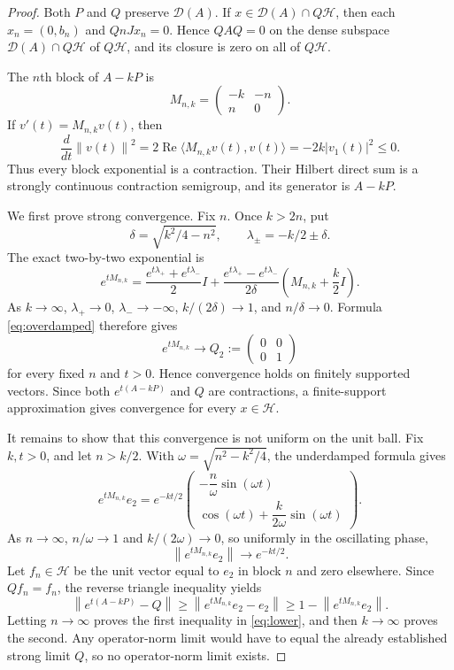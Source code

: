 \documentclass[11pt]{article}
\newcommand{\Hh}{\mathcal H}
\newcommand{\D}{\mathcal D}
\newcommand{\opnorm}[1]{\left\lVert #1\right\rVert}
\begin{document}
\begin{proof}
Both $P$ and $Q$ preserve $\D(A)$. If $x\in\D(A)\cap Q\Hh$, then each
$x_n=(0,b_n)$ and $QnJx_n=0$. Hence $QAQ=0$ on the dense subspace
$\D(A)\cap Q\Hh$ of $Q\Hh$, and its closure is zero on all of $Q\Hh$.

The $n$th block of $A-kP$ is
\[
                   M_{n,k}=\begin{pmatrix}-k&-n\\n&0\end{pmatrix}.
\]
If $v'(t)=M_{n,k}v(t)$, then
\[
       \frac{d}{dt}\opnorm{v(t)}^2
          =2\operatorname{Re}\langle M_{n,k}v(t),v(t)\rangle
          =-2k|v_1(t)|^2\le0.
\]
Thus every block exponential is a contraction. Their Hilbert direct sum is a
strongly continuous contraction semigroup, and its generator is $A-kP$.

We first prove strong convergence. Fix $n$. Once $k>2n$, put
\[
 \delta=\sqrt{k^2/4-n^2},\qquad
 \lambda_\pm=-k/2\pm\delta.
\]
The exact two-by-two exponential is
\begin{equation}\label{eq:overdamped}
 e^{tM_{n,k}}
 =\frac{e^{t\lambda_+}+e^{t\lambda_-}}2 I
 +\frac{e^{t\lambda_+}-e^{t\lambda_-}}{2\delta}
       \left(M_{n,k}+\frac{k}{2}I\right).
\end{equation}
As $k\to\infty$, $\lambda_+\to0$, $\lambda_-\to-\infty$,
$k/(2\delta)\to1$, and $n/\delta\to0$. Formula
\eqref{eq:overdamped} therefore gives
\[
             e^{tM_{n,k}}\longrightarrow
             Q_2:=\begin{pmatrix}0&0\\0&1\end{pmatrix}
\]
for every fixed $n$ and $t>0$. Hence convergence holds on finitely supported
vectors. Since both $e^{t(A-kP)}$ and $Q$ are contractions, a finite-support
approximation gives convergence for every $x\in\Hh$.

It remains to show that this convergence is not uniform on the unit ball.
Fix $k,t>0$, and let $n>k/2$. With
$\omega=\sqrt{n^2-k^2/4}$, the underdamped formula gives
\begin{equation}\label{eq:underdamped}
 e^{tM_{n,k}}e_2=e^{-kt/2}
 \begin{pmatrix}
 -\dfrac{n}{\omega}\sin(\omega t)\\[4pt]
 \cos(\omega t)+\dfrac{k}{2\omega}\sin(\omega t)
 \end{pmatrix}.
\end{equation}
As $n\to\infty$, $n/\omega\to1$ and $k/(2\omega)\to0$, so uniformly in the
oscillating phase,
\[
                    \opnorm{e^{tM_{n,k}}e_2}\longrightarrow e^{-kt/2}.
\]
Let $f_n\in\Hh$ be the unit vector equal to $e_2$ in block $n$ and zero
elsewhere. Since $Qf_n=f_n$, the reverse triangle inequality yields
\[
 \opnorm{e^{t(A-kP)}-Q}
 \ge \opnorm{e^{tM_{n,k}}e_2-e_2}
 \ge 1-\opnorm{e^{tM_{n,k}}e_2}.
\]
Letting $n\to\infty$ proves the first inequality in \eqref{eq:lower}, and then
$k\to\infty$ proves the second. Any operator-norm limit would have to equal
the already established strong limit $Q$, so no operator-norm limit exists.
\end{proof}
\end{document}
